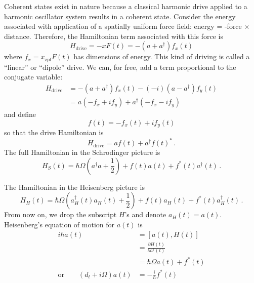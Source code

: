 
Coherent states exist in nature because a classical harmonic drive applied to a harmonic oscillator system results in a coherent state.
Consider the energy associated with application of a spatially uniform force field: energy = -force $\times$ distance.
Therefore, the Hamiltonian term associated with this force is
\begin{equation*}
  H_{\textrm{drive}}
  = -x F(t)
  = -(a + a^\dagger) f_x(t)
\end{equation*}
where $f_{x} = x_\text{zpf} F(t)$ has dimensions of energy.
This kind of driving is called a ``linear'' or ``dipole'' drive.
We can, for free, add a term proportional to the conjugate variable:
\begin{align*}
  H_{\textrm{drive}}
  &=  -(a+a^{\dagger})f_{x}(t)-(-i)(a-a^{\dagger})f_{y}(t)\\
  &= a(-f_{x}+if_{y})+a^{\dagger}(-f_{x}-if_{y})
\end{align*}
and define
\begin{equation}
  f(t) = -f_x(t) + i f_y(t)
\end{equation}
so that the drive Hamiltonian is
\begin{equation*}
  H_{\textrm{drive}} = af(t)+a^{\dagger}f(t)^{*} \, .
\end{equation*}
The full Hamiltonian in the Schrodinger picture is
\begin{equation}
  H_S(t)
  = \hbar \Omega \left( a^{\dagger} a + \frac{1}{2} \right) + f(t) a(t) + f^*(t) a^\dagger(t)
  \, .
\end{equation}



The Hamiltonian in the Heisenberg picture is
\begin{equation}
  H_H(t)
  = \hbar \Omega \left( a_H^{\dagger}(t)a_H(t) + \frac{1}{2} \right) + f(t)a_H(t) + f^{*}(t)a_H^{\dagger}(t)
  \, .
\end{equation}
From now on, we drop the subscript $H$'s and denote $a_H(t) = a(t)$.
Heisenberg's equation of motion for $a(t)$ is
\begin{align*}
  i\hbar\dot{a}(t)
  &= \left[ a(t), H(t) \right] \\
  &= \frac{\partial H(t)}{\partial a^{\dagger}(t)} \\
  &= \hbar\Omega a(t) + f^{*}(t) \\
  \textrm{or} \qquad
  \left(d_{t}+i\Omega\right)a(t) &= -\frac{i}{\hbar}f^{*}(t)
\end{align*}

